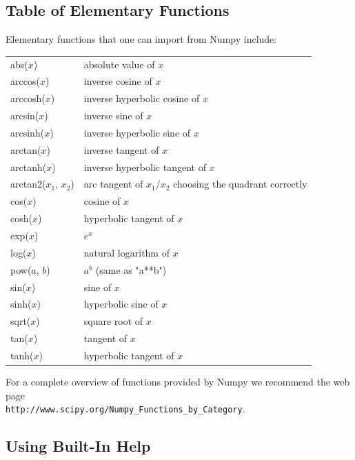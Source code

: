 \documentclass[article,A4,12pt]{llncs}
\begin{document}
\subsection{Table of Elementary Functions}

Elementary functions that one can import from Numpy include:\\

\begin{center}
\begin{tabular}{|l|l|}
\hline
abs($x$) &  absolute value of $x$\\
arccos($x$) &  inverse cosine of $x$ \\
arccosh($x$) &  inverse hyperbolic cosine of $x$ \\
arcsin($x$) & inverse sine of $x$ \\
arcsinh($x$) & inverse hyperbolic sine of $x$ \\
arctan($x$) & inverse tangent of $x$ \\
arctanh($x$) & inverse hyperbolic tangent of $x$ \\
arctan2($x_1$, $x_2$) & arc tangent of $x_1/x_2$ choosing the quadrant correctly \\
cos($x$) & cosine of $x$ \\
cosh($x$) & hyperbolic tangent of $x$ \\
exp($x$) & $e^x$ \\
log($x$) & natural logarithm of $x$ \\
pow($a$, $b$) & $a^b$ (same as "a**b")\\
sin($x$) & sine of $x$ \\
sinh($x$) & hyperbolic sine of $x$ \\
sqrt($x$) & square root of $x$ \\
tan($x$) & tangent of $x$\\
tanh($x$) & hyperbolic tangent of $x$ \\
\hline
\end{tabular}
\end{center}
\vspace{4mm}
\noindent
For a complete overview of functions provided by Numpy we recommend the 
web page \\ {\tt http://www.scipy.org/Numpy\_Functions\_by\_Category}.


\subsection{Using Built-In Help}
\end{document}
